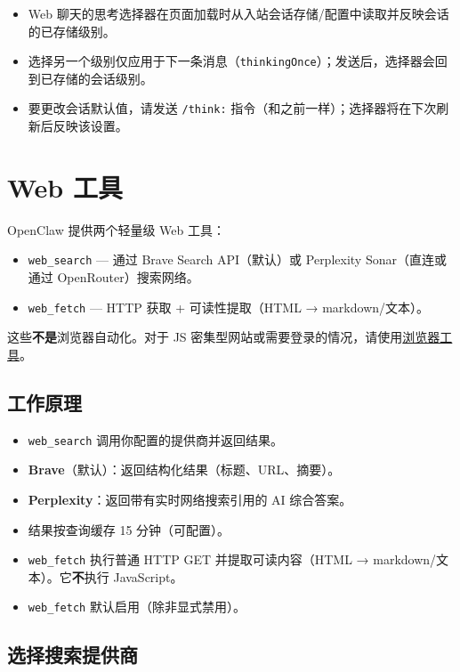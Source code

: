 \begin{itemize}
  \item Web 聊天的思考选择器在页面加载时从入站会话存储/配置中读取并反映会话的已存储级别。
  \item 选择另一个级别仅应用于下一条消息（\texttt{thinkingOnce}）；发送后，选择器会回到已存储的会话级别。
  \item 要更改会话默认值，请发送 \texttt{/think:} 指令（和之前一样）；选择器将在下次刷新后反映该设置。
\end{itemize}



\clearpage

\section{Web 工具}


OpenClaw 提供两个轻量级 Web 工具：

\begin{itemize}
  \item \texttt{web\_search} — 通过 Brave Search API（默认）或 Perplexity Sonar（直连或通过 OpenRouter）搜索网络。
  \item \texttt{web\_fetch} — HTTP 获取 + 可读性提取（HTML → markdown/文本）。
\end{itemize}


这些\textbf{不是}浏览器自动化。对于 JS 密集型网站或需要登录的情况，请使用\href{/tools/browser}{浏览器工具}。

\subsection{工作原理}


\begin{itemize}
  \item \texttt{web\_search} 调用你配置的提供商并返回结果。
  \item \textbf{Brave}（默认）：返回结构化结果（标题、URL、摘要）。
  \item \textbf{Perplexity}：返回带有实时网络搜索引用的 AI 综合答案。
  \item 结果按查询缓存 15 分钟（可配置）。
  \item \texttt{web\_fetch} 执行普通 HTTP GET 并提取可读内容（HTML → markdown/文本）。它\textbf{不}执行 JavaScript。
  \item \texttt{web\_fetch} 默认启用（除非显式禁用）。
\end{itemize}


\subsection{选择搜索提供商}



